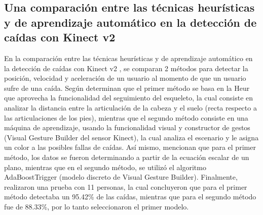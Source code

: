 \subsection{Una comparaci\'on entre las t\'ecnicas heur\'isticas y de aprendizaje autom\'atico en la detecci\'on de ca\'idas con Kinect v2} \label{tr:7}
En la comparaci\'on entre las t\'ecnicas heur\'isticas y de aprendizaje autom\'atico en la detecci\'on de ca\'idas con Kinect v2 \cite{amini2016comparison}, se comparan 2 m\'etodos para detectar la posici\'on, velocidad y aceleraci\'on de un usuario al momento de que un usuario sufre de una ca\'ida.
\medbreak 
Seg\'un  determinan que  el primer m\'etodo se basa en la \gls{Heur} que aprovecha la funcionalidad del seguimiento del esqueleto, la cual consiste en analizar la distancia entre la articulaci\'on de la cabeza y el suelo (recta respecto a las articulaciones de los pies), mientras que el segundo m\'etodo consiste en una m\'aquina de aprendizaje, usando la funcionalidad visual y constructor de gestos (Visual Gesture Builder del sensor Kinect), la cual analiza el escenario y le asigna un color a las posibles fallas de ca\'idas.
\medbreak 
As\'i mismo,  mencionan que para el primer m\'etodo, los datos se fueron determinando a partir de la ecuaci\'on escalar de un plano, mientras que en el segundo m\'etodo, se utiliz\'o el algoritmo AdaBoostTrigger (modelo discreto de Visual Gesture Builder).
\medbreak 
Finalmente,  realizaron una prueba con 11 personas, la cual concluyeron que para el primer m\'etodo detectaba un 95.42\% de las ca\'idas, mientras que para el segundo m\'etodo fue de 88.33\%, por lo tanto seleccionaron el primer modelo.
